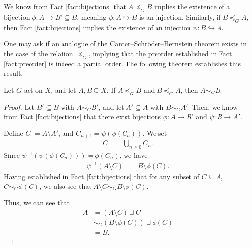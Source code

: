 We know from Fact \ref{fact:bijections} that $A\preceq_{G}B$ implies the existence of a bijection $\phi\colon A\rightarrow B'\subseteq B$, meaning $\phi\colon A\hookrightarrow B$ is an injection. Similarly, if $B\preceq_{G}A$, then Fact \ref{fact:bijections} implies the existence of an injection $\psi\colon B\hookrightarrow A$.\newline

One may ask if an analogue of the Cantor--Schröder--Bernstein theorem exists in the case of the relation $\preceq_{G}$, implying that the preorder established in Fact \ref{fact:preorder} is indeed a partial order. The following theorem establishes this result.
\begin{theorem}
  Let $G$ act on $X$, and let $A,B\subseteq X$. If $A\preceq_{G}B$ and $B\preceq_{G}A$, then $A\sim_{G}B$.\label{thm:csb_for_equidecomposability}
\end{theorem}
\begin{proof}
  Let $B'\subseteq B$ with $A\sim_{G}B'$, and let $A'\subseteq A$ with $B\sim_{G}A'$. Then, we know from Fact \ref{fact:bijections} that there exist bijections $\phi\colon A\rightarrow B'$ and $\psi\colon B\rightarrow A'$.\newline

  Define $C_0 = A\setminus A'$, and $C_{n+1} = \psi\left(\phi\left(C_n\right)\right)$. We set
  \begin{align*}
    C &= \bigcup_{n\geq 0}C_{n}.
  \end{align*}
  Since $\psi^{-1}\left(\psi\left(\phi\left(C_n\right)\right)\right) = \phi\left(C_n\right)$, we have
  \begin{align*}
    \psi^{-1}\left(A\setminus C\right) &= B\setminus \phi(C).
  \end{align*}
  Having established in Fact \ref{fact:bijections} that for any subset of $C\subseteq A$, $C\sim_{G} \phi(C)$, we also see that $A\setminus C \sim_{G} B\setminus \phi(C)$.\newline

  Thus, we can see that
  \begin{align*}
    A &= \left(A\setminus C\right)\sqcup C\\
      &\sim_{G}\left(B\setminus \phi(C)\right)\sqcup \phi(C)\\
      &= B.
  \end{align*}
\end{proof}

